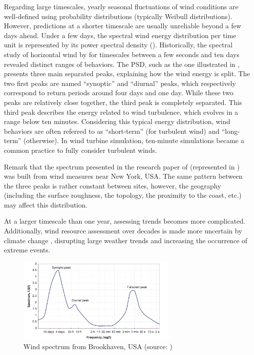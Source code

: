 Regarding large timescales, yearly seasonal fluctuations of wind conditions are well-defined using probability distributions (typically Weibull distributions). 
However, predictions at a shorter timescale are usually unreliable beyond a few days ahead. 
Under a few days, the spectral wind energy distribution per time unit is represented by its power spectral density (). 
Historically, the spectral study of horizontal wind by \citet{van_1957_wind_psd} for timescales between a few seconds and ten days revealed distinct ranges of behaviors. 
The PSD, such as the one illustrated in , presents three main separated peaks, explaining how the wind energy is split. 
The two first peaks are named ``synoptic'' and ``diurnal'' peaks, which respectively correspond to return periods around four days and one day. 
While these two peaks are relatively close together, the third peak is completely separated. 
This third peak describes the energy related to wind turbulence, which evolves in a range below ten minutes. 
Considering this typical energy distribution, wind behaviors are often referred to as ``short-term'' (for turbulent wind) and ``long-term'' (otherwise). 
In wind turbine simulation, ten-minute simulations became a common practice to fully consider turbulent winds. 

Remark that the spectrum presented in the research paper of \citet{van_1957_wind_psd} (represented in ) was built from wind measures near New York, USA. 
The same pattern between the three peaks is rather constant between sites, however, the geography (including the surface roughness, the topology, the proximity to the coast, etc.) may affect this distribution. 

At a larger timescale than one year, assessing trends becomes more complicated. 
Additionally, wind resource assessment over decades is made more uncertain by climate change \cite{nagababu_2023_climate_change}, disrupting large weather trends and increasing the occurrence of extreme events. 

\begin{figure}
    \centering
    \includegraphics[width=0.7\textwidth]{./part1/figures/wind_spectrum.png}
    \caption{Wind spectrum from Brookhaven, USA (source: \citealp{burton_2021_wind_handbook})}
    \label{fig:wind_psd}
\end{figure}





